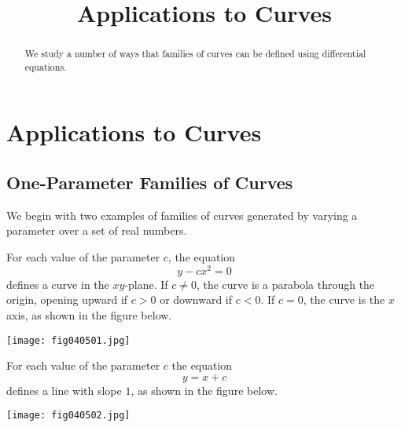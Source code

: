\documentclass{ximera}
\title{Applications to Curves}
\begin{document}
 
\begin{abstract}
 We study a number of ways that families of curves can be defined using differential equations.
\end{abstract}
 
\maketitle
 
 
 
\section*{Applications to Curves}
 
\subsection*{One-Parameter Families of Curves}
 
We begin with two examples of families of curves generated by varying a parameter over a set of real numbers.
 
\begin{example}\label{example:4.5.1}
For each value of the parameter $c$, the equation
\begin{equation} \label{eq:4.5.1}
y-cx^2=0
\end{equation}
defines a curve in the $xy$-plane. If $c \neq 0$, the curve is a
parabola through the origin, opening upward if $c>0$ or downward if
$c<0$.   If $c=0$, the curve is the $x$ axis, as shown in the figure below.
 
\begin{image}
  \texttt{[image: fig040501.jpg]}
\end{image}
 
\end{example}
 
 
 
\begin{example} \label{example:4.5.2}
For each value of the parameter $c$ the equation
\begin{equation} \label{eq:4.5.2}
y=x+c
\end{equation}
 defines a line with slope $1$, as shown in the figure below.
  
 \begin{image}
  \texttt{[image: fig040502.jpg]}
\end{image}
\end{example}
 
\end{document}
